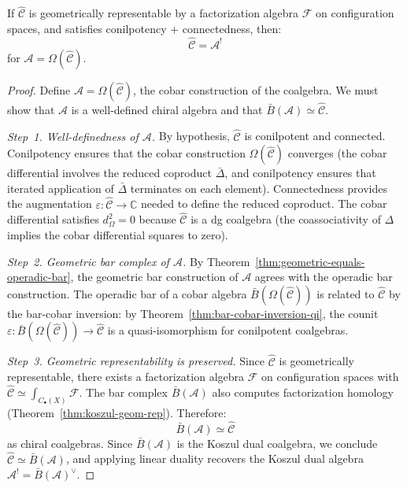 \begin{corollary}\label{cor:geom-implies-koszul}
If $\widehat{\mathcal{C}}$ is geometrically representable by a factorization algebra
$\mathcal{F}$ on configuration spaces, and satisfies conilpotency + connectedness,
then:
\[\widehat{\mathcal{C}} = \mathcal{A}^!\]
for $\mathcal{A} = \Omega(\widehat{\mathcal{C}})$.
\end{corollary}

\begin{proof}
Define $\mathcal{A} = \Omega(\widehat{\mathcal{C}})$, the cobar construction
of the coalgebra.  We must show that $\mathcal{A}$ is a well-defined chiral algebra
and that $\bar{B}(\mathcal{A}) \simeq \widehat{\mathcal{C}}$.

\emph{Step~1. Well-definedness of $\mathcal{A}$.}
By hypothesis, $\widehat{\mathcal{C}}$ is conilpotent and connected.  Conilpotency
ensures that the cobar construction $\Omega(\widehat{\mathcal{C}})$ converges
(the cobar differential involves the reduced coproduct $\bar{\Delta}$, and
conilpotency ensures that iterated application of $\bar{\Delta}$ terminates on
each element).  Connectedness provides the augmentation
$\varepsilon\colon \widehat{\mathcal{C}} \to \mathbb{C}$ needed to define
the reduced coproduct.  The cobar differential satisfies
$d_\Omega^2 = 0$ because $\widehat{\mathcal{C}}$ is a dg coalgebra
(the coassociativity of $\Delta$ implies the cobar differential squares to zero).

\emph{Step~2. Geometric bar complex of $\mathcal{A}$.}
By Theorem~\ref{thm:geometric-equals-operadic-bar}, the geometric bar
construction of $\mathcal{A}$ agrees with the operadic bar construction.
The operadic bar of a cobar algebra $\bar{B}(\Omega(\widehat{\mathcal{C}}))$
is related to $\widehat{\mathcal{C}}$ by the bar-cobar inversion:
by Theorem~\ref{thm:bar-cobar-inversion-qi}, the counit
$\varepsilon\colon \bar{B}(\Omega(\widehat{\mathcal{C}})) \to \widehat{\mathcal{C}}$
is a quasi-isomorphism for conilpotent coalgebras.

\emph{Step~3. Geometric representability is preserved.}
Since $\widehat{\mathcal{C}}$ is geometrically representable, there exists
a factorization algebra $\mathcal{F}$ on configuration spaces with
$\widehat{\mathcal{C}} \simeq \int_{C_\bullet(X)} \mathcal{F}$.
The bar complex $\bar{B}(\mathcal{A})$ also computes factorization homology
(Theorem~\ref{thm:koszul-geom-rep}).  Therefore:
\[
\bar{B}(\mathcal{A}) \simeq \widehat{\mathcal{C}}
\]
as chiral coalgebras.  Since $\bar{B}(\mathcal{A})$ is the Koszul dual
coalgebra, we conclude $\widehat{\mathcal{C}} \simeq \bar{B}(\mathcal{A})$,
and applying linear duality recovers the Koszul dual algebra
$\mathcal{A}^! = \bar{B}(\mathcal{A})^\vee$.
\end{proof}

